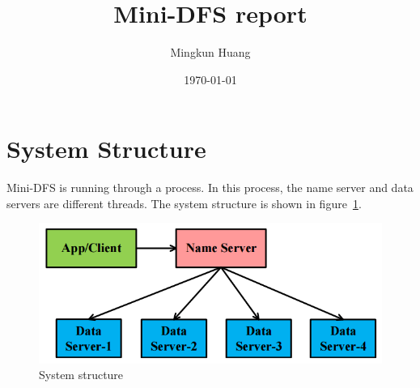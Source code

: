 \documentclass{article}
\title{Mini-DFS report}
\author{Mingkun Huang}
\date{\today}
\begin{document}
\maketitle

\section{System Structure}
Mini-DFS is running through a process. In this process, the name server and data servers are different threads.
The system structure is shown in figure~\ref{fig:dfs}.

\begin{figure}[tbh]
    \centering
    \includegraphics[scale=.5]{project4_pic1}
    \caption{System structure}
    \label{fig:dfs}
\end{figure}
\end{document}
